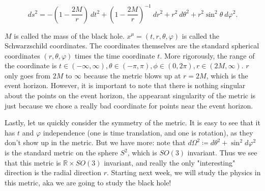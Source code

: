 \documentclass[10pt]{article}
\begin{document}
$$d s^2 = -(1-\frac{2M}{r}) \ dt^2 + (1- \frac{2M}{r})^{-1}\  dr^2 + r^2 \ d\theta^2  + r^2 \sin^2 \theta \  d\varphi^2.
$$



$M$ is called the mass of the black hole. $x^\mu = ( t,r,\theta, \varphi)$ is called the Schwarzschild coordinates. The coordinates themselves are the standard spherical coordinates $(r, \theta, \varphi)$ times the time coordinate $t$.  More rigorously, the range of the coordinate is $ t \in (-\infty, \infty), \theta \in (-\pi, \pi), \phi \in (0, 2\pi), r \in (2M, \infty)$. $r$ only goes from $2M$ to $\infty$ because the metric blows up at $r = 2M$, which is the event horizon. However, it is important to note that there is nothing singular about the points on the event horizon, the appearant singularity of the metric is just because we chose a really bad coordinate for points near the event horizon.

Lastly, let us quickly consider the symmetry of the metric. It is easy to see that it has $t$ and $\varphi$ independence (one is time translation, and one is rotation), as they don't show up in the metric. But we have more: note that $d\Omega^2 \coloneqq d\theta^2 + \sin^2 d\varphi^2$ is the standard metric on the sphere $S^2$, which is $SO(3)$ invariant. Thus we see that this metric is $\mathbb{R} \times SO(3)$ invariant, and really the only "interesting" direction is the radial direction $r$. Starting next week, we will study the physics in this metric, aka we are going to study the black hole!
\end{document}
